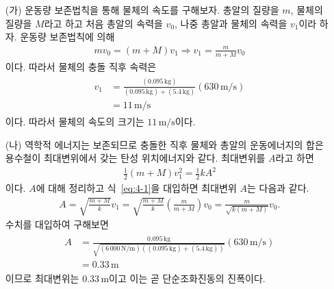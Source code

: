 \documentclass[floatfix,nofootinbib,superscriptaddress,fleqn]{revtex4-2}
\begin{document}
\begin{itemize}
  \item[(가)] 운동량 보존법칙을 통해 물체의 속도를 구해보자.
  총알의 질량을 $m$, 물체의 질량을 $M$라고 하고 처음 총알의 속력을 $v_0$,
  나중 총알과 물체의 속력을 $v_1$이라 하자. 운동량 보존법칙에 의해
  \begin{align}\label{eq:4-1}
    mv_0 = (m+M)v_1\Longrightarrow v_1 = \frac{m}{m+M}v_0
  \end{align}
  이다. 따라서 물체의 충돌 직후 속력은 
  \begin{align}
  \begin{split}
    v_1 &= \frac{(0.095\,\mathrm{kg})}
    {(0.095\,\mathrm{kg})+(5.4\,\mathrm{kg})}(630\,\mathrm{m/s})  \\
    &= 11\,\mathrm{m/s}
  \end{split}
  \end{align}
  이다. 따라서 물체의 속도의 크기는 $11\,\mathrm{m/s}$이다.
  \item[(나)] 역학적 에너지는 보존되므로 충돌한 직후 물체와 총알의 운동에너지의 합은 
  용수철이 최대변위에서 갖는 탄성 위치에너지와 같다. 최대변위를 $A$라고 하면
  \begin{align}
    \frac{1}{2}(m+M)v_1^2 = \frac{1}{2}kA^2
  \end{align}
  이다. $A$에 대해 정리하고 식~\eqref{eq:4-1}을 대입하면 최대변위 $A$는 다음과 같다.
  \begin{align}
    A = \sqrt{\frac{m+M}{k}}v_1 = \sqrt{\frac{m+M}{k}}\left(\frac{m}{m+M}\right)v_0
    =\frac{m}{\sqrt{k(m+M)}}v_0.
  \end{align}
  수치를 대입하여 구해보면
  \begin{align}
    \begin{split}
      A &= \frac{0.095\,\mathrm{kg}}{\sqrt{(6\,000\,\mathrm{N/m})((0.095\,\mathrm{kg})
      +(5.4\,\mathrm{kg}))}}(630\,\mathrm{m/s})  \\
      &= 0.33\,\mathrm{m}
    \end{split}
  \end{align}
  이므로 최대변위는 $ 0.33\,\mathrm{m}$이고 이는 곧 단순조화진동의 진폭이다.
\end{itemize}

 
\end{document}
